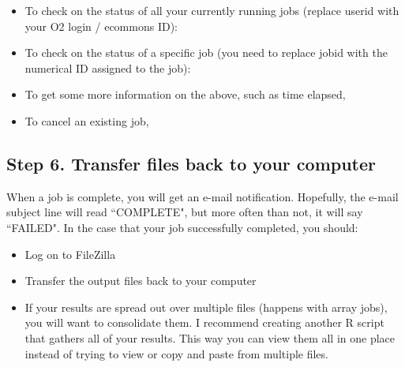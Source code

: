 \documentclass[11pt, oneside]{article}   	%
\begin{document}
\begin{itemize}
	\item To check on the status of all your currently running jobs (replace userid with your O2 login / ecommons ID): 
	
	\begin{center}
	\end{center}
	
	\item To check on the status of a specific job (you need to replace jobid with the numerical ID assigned to the job): 
	
		\begin{center}
	\end{center}
	
	 \item To get some more information on the above, such as time elapsed, 
	 
	 \begin{center}
	 \end{center}

	\item To cancel an existing job, 
	
	\begin{center}
	\end{center}
	
	 
\end{itemize}

\subsection*{Step 6. Transfer files back to your computer} 

When a job is complete, you will get an e-mail notification. Hopefully, the e-mail subject line will read ``COMPLETE", but more often than not, it will say ``FAILED". In the case that your job successfully completed, you should: 

\begin{itemize}
	\item Log on to FileZilla 
	\item Transfer the output files back to your computer
	\item If your results are spread out over multiple files (happens with array jobs), you will want to consolidate them. I recommend creating another R script that gathers all of your results. This way you can view them all in one place instead of trying to view or copy and paste from multiple files. 
\end{itemize}
\end{document}
